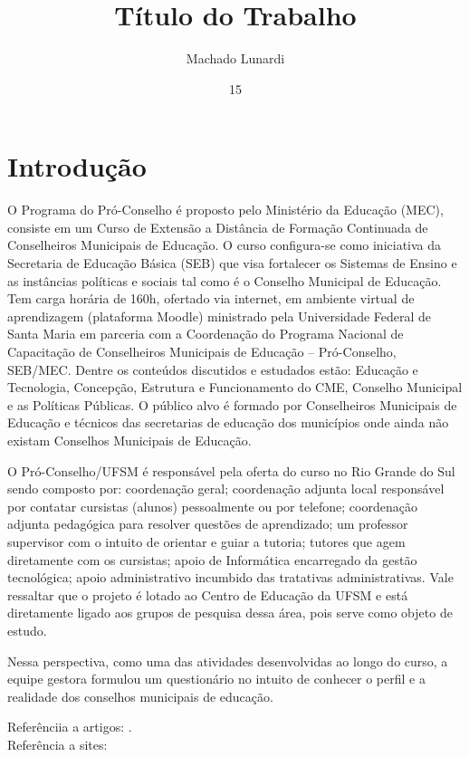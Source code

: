 \documentclass[projtg]{mdtufsm}
\title{Título do Trabalho}
\author{Machado Lunardi}{Gabriel}
\institute{Centro de Tecnologia}
\date{15}{Agosto}{2014}
\begin{document}
\maketitle
\setlength{\baselineskip}{1.5\baselineskip}

\chapter{Introdução}

O Programa do Pró-Conselho é proposto pelo Ministério da Educação (MEC), consiste em um Curso de Extensão a Distância de Formação Continuada de Conselheiros Municipais de Educação. O curso configura-se como iniciativa da Secretaria de Educação Básica (SEB) que visa fortalecer os Sistemas de Ensino e as instâncias políticas e sociais tal como é o Conselho Municipal de Educação. Tem carga horária de 160h, ofertado via internet, em ambiente virtual de aprendizagem (plataforma Moodle) ministrado pela Universidade Federal de Santa Maria em parceria com a Coordenação do Programa Nacional de Capacitação de Conselheiros Municipais de Educação – Pró-Conselho, SEB/MEC. Dentre os conteúdos discutidos e estudados estão: Educação e Tecnologia, Concepção, Estrutura e Funcionamento do CME, Conselho Municipal e as Políticas Públicas. O público alvo é formado por Conselheiros Municipais de Educação e técnicos das secretarias de educação dos municípios onde ainda não existam Conselhos Municipais de Educação. 

 O Pró-Conselho/UFSM é responsável pela oferta do curso no Rio Grande do Sul sendo composto por: coordenação geral; coordenação adjunta local responsável por contatar cursistas (alunos) pessoalmente ou por telefone; coordenação adjunta pedagógica para resolver questões de aprendizado; um professor supervisor com o intuito de orientar e guiar a tutoria; tutores que agem diretamente com os cursistas; apoio de Informática encarregado da gestão tecnológica; apoio administrativo incumbido das tratativas administrativas. Vale ressaltar que o projeto é lotado ao Centro de Educação da UFSM e está diretamente ligado aos grupos de pesquisa dessa área, pois serve como objeto de estudo. 

Nessa perspectiva, como uma das atividades desenvolvidas ao longo do curso, a equipe gestora formulou um questionário no intuito de conhecer o perfil e a realidade dos conselhos municipais de educação. 

Referênciia a artigos: \cite{artigo2013sobrenome}. \\
Referência a sites: \cite{siteref2013}
\end{document}
